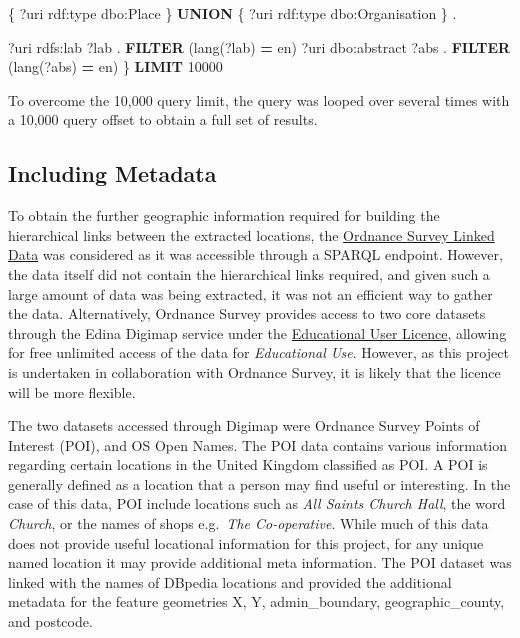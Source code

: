 \documentclass[10pt,]{article}
\renewcommand\texttt[1]{{\ttfamily\color{ttcolor}#1}}
\newenvironment{Shaded}{\begin{snugshade}}{\end{snugshade}}
\newcommand{\CharTok}[1]{\textcolor[rgb]{0.31,0.60,0.02}{#1}}
\newcommand{\DecValTok}[1]{\textcolor[rgb]{0.00,0.00,0.81}{#1}}
\newcommand{\FunctionTok}[1]{\textcolor[rgb]{0.00,0.00,0.00}{#1}}
\newcommand{\KeywordTok}[1]{\textcolor[rgb]{0.13,0.29,0.53}{\textbf{#1}}}
\newcommand{\NormalTok}[1]{#1}
\newcommand{\OperatorTok}[1]{\textcolor[rgb]{0.81,0.36,0.00}{\textbf{#1}}}
\newcommand{\StringTok}[1]{\textcolor[rgb]{0.31,0.60,0.02}{#1}}
\begin{document}
\begin{Shaded}
\begin{Highlighting}[]
\NormalTok{            \{ ?uri rdf}\CharTok{:type}\NormalTok{ dbo}\CharTok{:Place}\NormalTok{ \} }\KeywordTok{UNION}
\NormalTok{            \{ ?uri rdf}\CharTok{:type}\NormalTok{ dbo}\CharTok{:Organisation}\NormalTok{ \} .}

\NormalTok{              ?uri rdfs}\CharTok{:lab}\NormalTok{ ?lab . }\KeywordTok{FILTER}\NormalTok{ (lang(?lab) }\OperatorTok{=} \StringTok{\textquotesingle{}en\textquotesingle{}}\NormalTok{)}
\NormalTok{              ?uri dbo}\CharTok{:abstract}\NormalTok{ ?}\FunctionTok{abs}\NormalTok{ . }\KeywordTok{FILTER}\NormalTok{ (lang(?}\FunctionTok{abs}\NormalTok{) }\OperatorTok{=} \StringTok{\textquotesingle{}en\textquotesingle{}}\NormalTok{)}
\NormalTok{    \} }\KeywordTok{LIMIT} \DecValTok{10000}
\end{Highlighting}
\end{Shaded}

To overcome the 10,000 query limit, the query was looped over several
times with a 10,000 query offset to obtain a full set of results.

\hypertarget{including-metadata}{%
\subsection{Including Metadata}\label{including-metadata}}

To obtain the further geographic information required for building the
hierarchical links between the extracted locations, the
\href{https://data.ordnancesurvey.co.uk/datasets/os-linked-data}{Ordnance
Survey Linked Data} was considered as it was accessible through a SPARQL
endpoint. However, the data itself did not contain the hierarchical
links required, and given such a large amount of data was being
extracted, it was not an efficient way to gather the data.
Alternatively, Ordnance Survey provides access to two core datasets
through the Edina Digimap service under the
\href{https://digimap.edina.ac.uk/webhelp/os/copyright/digimap_os_eula.pdf}{Educational
User Licence}, allowing for free unlimited access of the data for
\emph{Educational Use}. However, as this project is undertaken in
collaboration with Ordnance Survey, it is likely that the licence will
be more flexible.

The two datasets accessed through Digimap were Ordnance Survey Points of
Interest (POI), and OS Open Names. The POI data contains various
information regarding certain locations in the United Kingdom classified
as POI. A POI is generally defined as a location that a person may find
useful or interesting. In the case of this data, POI include locations
such as \emph{All Saints Church Hall}, the word \emph{Church}, or the
names of shops e.g.~\emph{The Co-operative}. While much of this data
does not provide useful locational information for this project, for any
unique named location it may provide additional meta information. The
POI dataset was linked with the names of DBpedia locations and provided
the additional metadata for the feature geometries \texttt{X},
\texttt{Y}, \texttt{admin\_boundary}, \texttt{geographic\_county}, and
\texttt{postcode}.
\end{document}
